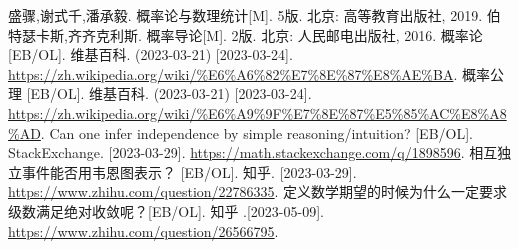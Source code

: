 \begin{thebibliography}{99}%
     盛骤,谢式千,潘承毅. 概率论与数理统计[M]. 5版. 北京: 高等教育出版社, 2019.
     伯特瑟卡斯,齐齐克利斯. 概率导论[M]. 2版. 北京: 人民邮电出版社, 2016.
     概率论 [EB/OL]. 维基百科. (2023-03-21) [2023-03-24]. \\\url{https://zh.wikipedia.org/wiki/%E6%A6%82%E7%8E%87%E8%AE%BA}.
     概率公理 [EB/OL]. 维基百科. (2023-03-21) [2023-03-24]. \\\url{https://zh.wikipedia.org/wiki/%E6%A9%9F%E7%8E%87%E5%85%AC%E8%A8%AD}.
     Can one infer independence by simple reasoning/intuition? [EB/OL]. StackExchange. [2023-03-29]. \url{https://math.stackexchange.com/q/1898596}.
     相互独立事件能否用韦恩图表示？ [EB/OL]. 知乎. [2023-03-29]. \\\url{https://www.zhihu.com/question/22786335}.
     定义数学期望的时候为什么一定要求级数满足绝对收敛呢？[EB/OL]. 知乎 .[2023-05-09]. \\\url{https://www.zhihu.com/question/26566795}.
\end{thebibliography}
